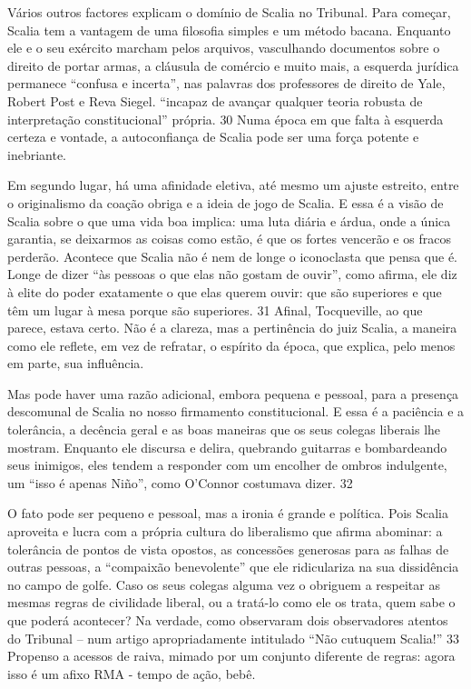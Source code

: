 \par
 
Vários outros factores explicam o domínio de Scalia no Tribunal. Para começar, Scalia tem a vantagem de uma filosofia simples e um método bacana. Enquanto ele e o seu exército marcham pelos arquivos, vasculhando documentos sobre o direito de portar armas, a cláusula de comércio e muito mais, a esquerda jurídica permanece “confusa e incerta”, nas palavras dos professores de direito de Yale, Robert Post e Reva Siegel.  “incapaz de avançar qualquer teoria robusta de interpretação constitucional” própria.
 {\color{blue} 30}  
Numa época em que falta à esquerda certeza e vontade, a autoconfiança de Scalia pode ser uma força potente e inebriante.
 
\par
 
Em segundo lugar, há uma afinidade eletiva, até mesmo um ajuste estreito, entre o originalismo da coação obriga e a ideia de jogo de Scalia. E essa é a visão de Scalia sobre o que uma vida boa implica: uma luta diária e árdua, onde a única garantia, se deixarmos as coisas como estão, é que os fortes vencerão e os fracos perderão. Acontece que Scalia não é nem de longe o iconoclasta que pensa que é. Longe de dizer “às pessoas o que elas não gostam de ouvir”, como afirma, ele diz à elite do poder exatamente o que elas querem ouvir: que são superiores e que têm um lugar à mesa porque são superiores.
 {\color{blue} 31}  
Afinal, Tocqueville, ao que parece, estava certo. Não é a clareza, mas a pertinência do juiz Scalia, a maneira como ele reflete, em vez de refratar, o espírito da época, que explica, pelo menos em parte, sua influência.
 
\par
 
Mas pode haver uma razão adicional, embora pequena e pessoal, para a presença descomunal de Scalia no nosso firmamento constitucional. E essa é a paciência e a tolerância, a decência geral e as boas maneiras que os seus colegas liberais lhe mostram. Enquanto ele discursa e delira, quebrando guitarras e bombardeando seus inimigos, eles tendem a responder com um encolher de ombros indulgente, um “isso é apenas Niño”, como O’Connor costumava dizer.
 {\color{blue} 32}  

 
\par
 
O fato pode ser pequeno e pessoal, mas a ironia é grande e política. Pois Scalia aproveita e lucra com a própria cultura do liberalismo que afirma abominar: a tolerância de pontos de vista opostos, as concessões generosas para as falhas de outras pessoas, a “compaixão benevolente” que ele ridiculariza na sua dissidência no campo de golfe. Caso os seus colegas alguma vez o obriguem a respeitar as mesmas regras de civilidade liberal, ou a tratá-lo como ele os trata, quem sabe o que poderá acontecer? Na verdade, como observaram dois observadores atentos do Tribunal – num artigo apropriadamente intitulado “Não cutuquem Scalia!”
 {\color{blue} 33}  
Propenso a acessos de raiva, mimado por um conjunto diferente de regras: agora isso é um afixo RMA - tempo de ação, bebê.
 
